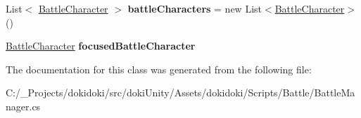 \begin{DoxyCompactItemize}
\item 
List$<$ \hyperlink{class_battle_character}{Battle\+Character} $>$ {\bfseries battle\+Characters} = new List$<$\hyperlink{class_battle_character}{Battle\+Character}$>$()\hypertarget{class_battle_manager_ae93f70fe9cdcd0894ab42119883f69c9}{}\label{class_battle_manager_ae93f70fe9cdcd0894ab42119883f69c9}

\item 
\hyperlink{class_battle_character}{Battle\+Character} {\bfseries focused\+Battle\+Character}\hypertarget{class_battle_manager_a0f54a4bba1e478d267897bbf6aa97bb4}{}\label{class_battle_manager_a0f54a4bba1e478d267897bbf6aa97bb4}

\end{DoxyCompactItemize}


The documentation for this class was generated from the following file\+:\begin{DoxyCompactItemize}
\item 
C\+:/\+\_\+\+Projects/dokidoki/src/doki\+Unity/\+Assets/dokidoki/\+Scripts/\+Battle/Battle\+Manager.\+cs\end{DoxyCompactItemize}
